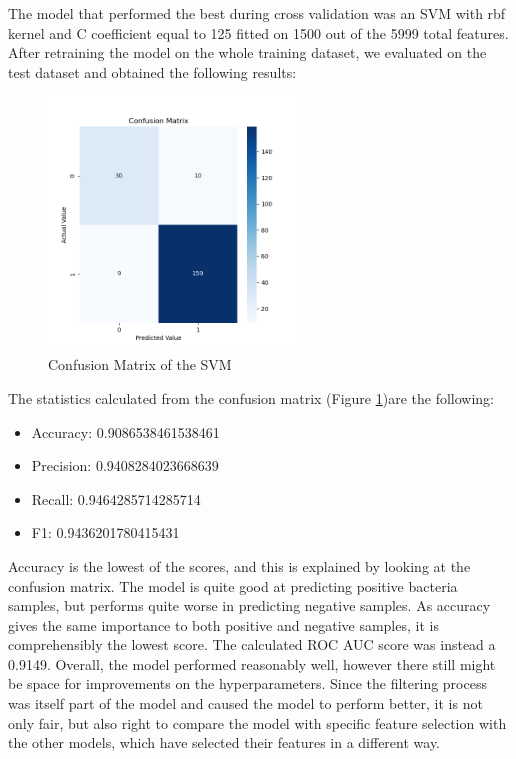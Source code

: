 \documentclass{article}
\begin{document}
The model that performed the best during cross validation was an SVM with rbf kernel and C coefficient equal to 125 fitted on 1500 out of the 5999 total features. After retraining the model on the whole training dataset, we evaluated on the test dataset and obtained the following results:

\begin{figure}[h]
	\centering
	\includegraphics[width=0.6\textwidth]{confusion_matrix_SVM.png}
	 \vspace{-1em}
	\caption{Confusion Matrix of the SVM}
    \label{fig:Confusion Matrix of the SVM}
\end{figure}

The statistics calculated from the confusion matrix (Figure \ref{fig:Confusion Matrix of the SVM})are the following: 
\begin{itemize}
  \item Accuracy:   0.9086538461538461
  \item Precision:   0.9408284023668639
  \item Recall:   0.9464285714285714
  \item F1:   0.9436201780415431
\end{itemize}
Accuracy is the lowest of the scores, and this is explained by looking at the confusion matrix. The model is quite good at predicting positive bacteria samples, but performs quite worse in predicting negative samples. As accuracy gives the same importance to both positive and negative samples, it is comprehensibly the lowest score. The calculated ROC AUC score was instead a 0.9149. Overall, the model performed reasonably well, however there still might be space for improvements on the hyperparameters.
Since the filtering process was itself part of the model and caused the model to perform better, it is not only fair, but also right to compare the model with specific feature selection with the other models, which have selected their features in a different way.
\end{document}
